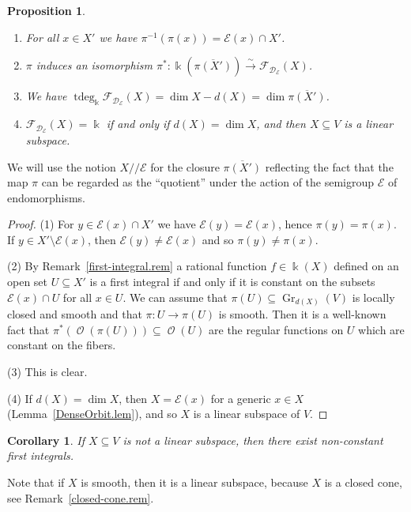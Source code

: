 \documentclass{amsart}
\newtheorem{prop}[thm]{Proposition}
\newtheorem{cor}[thm]{Corollary}
\theoremstyle{definition}
\theoremstyle{remark}
\begin{document}
\begin{prop}\label{quotient-mod-E.prop}\begin{enumerate}
\item
For all $x \in X'$ we have $\pi^{-1}(\pi(x)) = {\mathcal E}(x)\cap X'$.
\item 
$\pi$ induces an isomorphism $\pi^{*}\colon {\Bbbk}(\overline{\pi(X')}) {\xrightarrow{\sim}} {\mathcal F}_{{\mathcal D}_{\mathcal E}}(X)$.
\item
We have $\operatorname{tdeg}_{\Bbbk}{\mathcal F}_{{\mathcal D}_{\mathcal E}}(X) = \dim X - d(X)= \dim \overline{\pi(X')}$. 
\item
${\mathcal F}_{{\mathcal D}_{\mathcal E}}(X) = {\Bbbk}$ if and only if $d(X) = \dim X$, and then $X {\subseteq} V$ is a linear subspace.
\end{enumerate}
\end{prop}
We will use the notion $X{/\!\!/} {\mathcal E}$ for the closure $\overline{\pi(X')}$ reflecting the fact that the map $\pi$ can be regarded as the ``quotient'' under the action of the semigroup ${\mathcal E}$ of endomorphisms.
\begin{proof}
(1) For $y\in {\mathcal E}(x)\cap X'$ we have ${\mathcal E}(y)={\mathcal E}(x)$, hence $\pi(y) = \pi(x)$. If $y \in X' \setminus {\mathcal E}(x)$, then ${\mathcal E}(y) \neq {\mathcal E}(x)$ and so $\pi(y)\neq\pi(x)$.
\par\smallskip
(2) By Remark~\ref{first-integral.rem} a rational function $f \in {\Bbbk}(X)$ defined on an open set $U{\subseteq} X'$ is a first integral if and only if it is constant on the subsets ${\mathcal E}(x)\cap U$ for all $x \in U$. We can assume that $\pi(U) {\subseteq} \operatorname{Gr}_{d(X)}(V)$ is locally closed and smooth and that $\pi\colon U \to \pi(U)$ is smooth.  Then it is a well-known fact that $\pi^{*}(\operatorname{\mathcal O}(\pi(U))) {\subseteq} \operatorname{\mathcal O}(U)$ are the regular functions on $U$ which are constant on the fibers.
\par\smallskip
(3) This is clear. 
{\par\smallskip}
(4) If $d(X) = \dim X$, then $X = {\mathcal E}(x)$ for a generic $x\in X$ (Lemma~\ref{DenseOrbit.lem}), and so $X$ is a linear subspace of $V$.
\end{proof}
\begin{cor}
If $X {\subseteq} V$ is not a linear subspace, then there exist non-constant first integrals.
\end{cor}
Note that if $X$ is smooth, then it is a linear subspace, because $X$ is a closed cone, see Remark~\ref{closed-cone.rem}.
\end{document}
